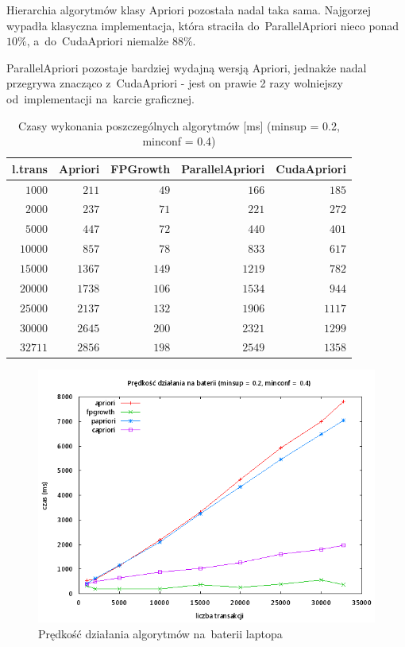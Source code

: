 Hierarchia algorytmów klasy Apriori pozostała nadal taka sama. Najgorzej wypadła klasyczna implementacja, która straciła do~ParallelApriori nieco ponad $10\%$, a~do~CudaApriori niemalże $88\%$. 

ParallelApriori pozostaje bardziej wydajną wersją Apriori, jednakże nadal przegrywa znacząco z~CudaApriori - jest on prawie 2 razy wolniejszy od~implementacji na~karcie graficznej.

\begin{table}
	\centering
	\begin{tabular}{r|r|r|r|r}
	\textbf{l.trans} & \textbf{Apriori} & \textbf{FPGrowth} & \textbf{ParallelApriori} & \textbf{CudaApriori}  \\ \hline
	$1000$ & $211$ & $49$ & $166$ & $185$ \\
	$2000$ & $237$ & $71$ & $221$ & $272$ \\
	$5000$ & $447$ & $72$ & $440$ & $401$ \\
	$10000$ & $857$ & $78$ & $833$ & $617$ \\
	$15000$ & $1367$ & $149$ & $1219$ & $782$ \\
	$20000$ & $1738$ & $106$ & $1534$ & $944$ \\
	$25000$ & $2137$ & $132$ & $1906$ & $1117$ \\
	$30000$ & $2645$ & $200$ & $2321$ & $1299$ \\
	$32711$ & $2856$ & $198$ & $2549$ & $1358$ \\
	\end{tabular}
	\caption{Czasy wykonania poszczególnych algorytmów [ms] (minsup = 0.2, minconf = 0.4)\label{tab:02_04}}
\end{table}

\begin{figure}[H]
\centering
\includegraphics[width=1.1\textwidth]{figures/06/02_04_bat.png}
\caption{Prędkość działania algorytmów na~baterii laptopa\label{rys:02_04_bat}}
\end{figure}

